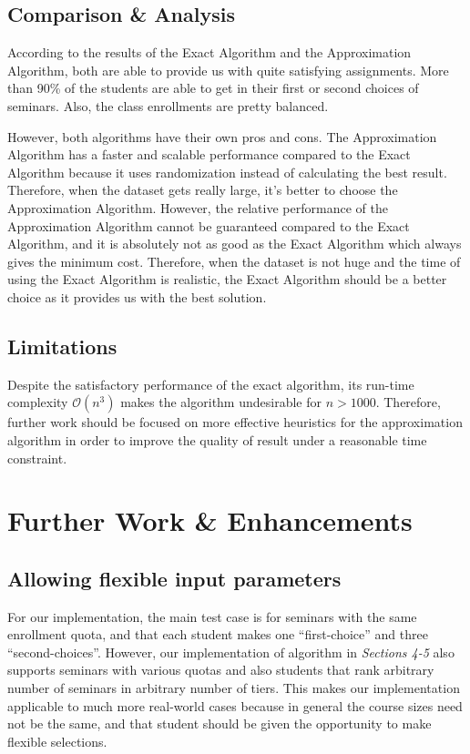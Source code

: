 \documentclass{article} %
\begin{document}
\subsection{Comparison \& Analysis}

\par\qquad According to the results of the Exact Algorithm and the Approximation Algorithm, both are able to provide us with quite satisfying assignments. More than 90\% of the students are able to get in their first or second choices of seminars. Also, the class enrollments are pretty balanced. 

However, both algorithms have their own pros and cons. The Approximation Algorithm has a faster and scalable performance compared to the Exact Algorithm because it uses randomization instead of calculating the best result. Therefore, when the dataset gets really large, it’s better to choose the Approximation Algorithm. However, the relative performance of the Approximation Algorithm cannot be guaranteed compared to the Exact Algorithm, and it is absolutely not as good as the Exact Algorithm which always gives the minimum cost. Therefore, when the dataset is not huge and the time of using the Exact Algorithm is realistic, the Exact Algorithm should be a better choice as it provides us with the best solution.

\subsection{Limitations}
    \par\qquad Despite the satisfactory performance of the exact algorithm, its run-time complexity $\mathcal{O}(n^3)$ makes the algorithm undesirable for $n>1000$. Therefore, further work should be focused on more effective heuristics for the approximation algorithm in order to improve the quality of result under a reasonable time constraint. 

\section{Further Work \& Enhancements}

\subsection{Allowing flexible input parameters}
    \par\qquad For our implementation, the main test case is for seminars with the same enrollment quota, and that each student makes one ``first-choice'' and three ``second-choices''. However, our implementation of algorithm in \emph{Sections 4-5} also supports seminars with various quotas and also students that rank arbitrary number of seminars in arbitrary number of tiers. This makes our implementation applicable to much more real-world cases because in general the course sizes need not be the same, and that student should be given the opportunity to make flexible selections.
\end{document}
